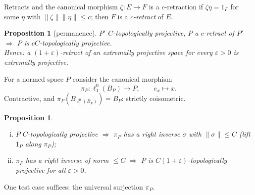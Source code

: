 \documentclass[10pt,aspectratio=169]{beamer}
\newtheorem{proposition}[theorem]{Proposition}
\newcommand{\lo}[1]{\ell_1^0(#1)}
\begin{document}
\begin{frame}{Retracts and the canonical morphism}
  $\zeta\colon E\to F$ is a \alert{$c$-retraction} if $\zeta\eta=1_F$ for some
  $\eta$ with $\|\zeta\|\|\eta\|\le c$; then $F$ is a \emph{$c$-retract} of $E$.
  \begin{proposition}[permanence]
    $P'$ $C$-topologically projective, $P$ a $c$-retract of $P'$
    $\Rightarrow$ $P$ is $cC$-topologically projective. \\
    Hence: a $(1+\varepsilon)$-retract of an extremally projective space for every
    $\varepsilon>0$ is extremally projective.
  \end{proposition}
  \medskip
  For a normed space $P$ consider the \alert{canonical morphism}
  \[
    \pi_P\colon\lo{B_P}\to P,\qquad e_x\mapsto x .
  \]
  Contractive, and $\pi_P(B_{\lo{B_P}})=B_P$: strictly coisometric.
  \begin{proposition}
    \begin{enumerate}[(i)]
      \item $P$ $C$-topologically projective $\Rightarrow$ $\pi_P$ has a right
        inverse $\sigma$ with $\|\sigma\|\le C$ (lift $1_P$ along $\pi_P$);
      \item $\pi_P$ has a right inverse of norm $\le C$ $\Rightarrow$ $P$ is
        $C(1+\varepsilon)$-topologically projective for all $\varepsilon>0$.
    \end{enumerate}
  \end{proposition}
  One test case suffices: the universal surjection $\pi_P$.
\end{frame}
\end{document}
